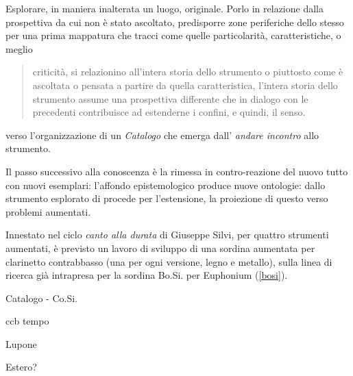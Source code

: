 \documentclass{gs-adonis}
\begin{document}
  Esplorare, in maniera inalterata un luogo, originale. Porlo in relazione dalla
  prospettiva da cui non è stato ascoltato, predisporre zone periferiche dello stesso
  per una prima mappatura che tracci come quelle particolarità, caratteristiche,
  o meglio

\begin{quote}
  criticità, si relazionino all'intera storia dello strumento o piuttosto
  come è ascoltata o pensata a partire da quella caratteristica, l'intera
  storia dello strumento assume una prospettiva differente che in dialogo con
  le precedenti contribuisce ad estenderne i confini, e quindi, il senso.
\end{quote}

verso l'organizzazione di un \emph{Catalogo} che emerga dall' \emph{andare incontro} allo strumento.

Il passo successivo alla conoscenza è la rimessa in contro-reazione del nuovo
tutto con nuovi esemplari: l'affondo epistemologico produce nuove ontologie:
dallo strumento esplorato di procede per l'estensione, la proiezione di questo
verso problemi aumentati.

Innestato nel ciclo \emph{canto alla durata} di Giuseppe Silvi, per quattro
strumenti aumentati, è previsto un lavoro di sviluppo di una sordina aumentata
per clarinetto contrabbasso (una per ogni versione, legno e metallo), sulla
linea di ricerca già intrapresa per la sordina Bo.Si. per Euphonium (\ref{bosi}).

\begin{description}
  \item[Catalogo - Co.Si.]
\end{description}

\begin{description}
  \item[ccb tempo]
\end{description}

\begin{description}
  \item[Lupone]
\end{description}









Estero?

\end{document}
